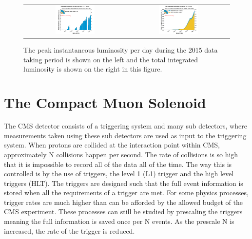 \begin{figure}[!ht]
  \begin{center}
    \begin{tabular}{c c}
      \includegraphics[width=0.4\textwidth]{cms/figs/peak_lumi_per_day_pp_2015.pdf} &
      \includegraphics[width=0.4\textwidth]{cms/figs/int_lumi_per_day_cumulative_pp_2015.pdf} \\      
    \end{tabular}
    \caption{
      The peak instantaneous luminosity per day during the 2015 data taking period is shown on the left
      and the total integrated luminosity is shown on the right in this figure.
      \label{fig:peaklumi}
    }
  \end{center}
\end{figure}

\section{The Compact Muon Solenoid}
The CMS detector consists of a triggering system and many sub detectors,
where measurements taken using these sub detectors are used as input to the triggering system.
When protons are collided at the interaction point within CMS, approximately N collisions happen per second.
The rate of collisions is so high that it is impossible to record all of the data all of the time.
The way this is controlled is by the use of triggers, the level 1 (L1) trigger and the high level triggers (HLT).
The triggers are designed such that the full event information is stored when all the requirements of a trigger are met.
For some physics processes, trigger rates are much higher than can be afforded by the allowed budget of the CMS experiment.
These processes can still be studied by prescaling the triggers meaning the full information is saved once per N events.
As the prescale N is increased, the rate of the trigger is reduced.

